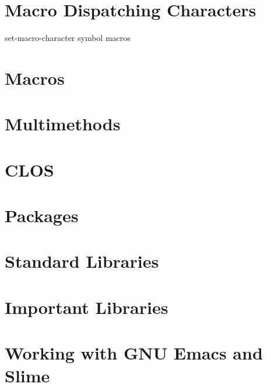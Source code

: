 \documentclass[11pt]{article}
\begin{document}
\section{Macro Dispatching Characters}
\label{sec-12}
set-macro-character
symbol macros
\section{Macros}
\label{sec-13}
\section{Multimethods}
\label{sec-14}
\section{CLOS}
\label{sec-15}
\section{Packages}
\label{sec-16}
\section{Standard Libraries}
\label{sec-17}
\section{Important Libraries}
\label{sec-18}
\section{Working with GNU Emacs and Slime}
\label{sec-19}
\end{document}

